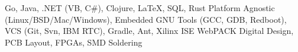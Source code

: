 {Go, Java, .NET (VB, C\#), Clojure, \LaTeX, SQL, Rust}
{Platform Agnostic (Linux/BSD/Mac/Windows), Embedded GNU Tools (GCC, GDB, Redboot), VCS (Git, Svn, IBM RTC), Gradle, Ant, Xilinx ISE WebPACK}
{Digital Design, PCB Layout, FPGAs, SMD Soldering}
